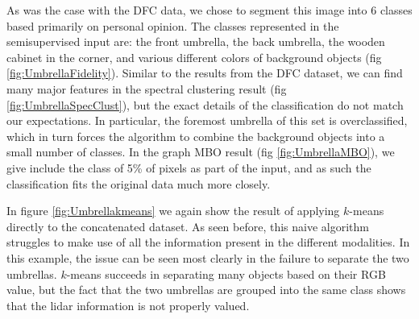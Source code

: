 \documentclass[journal]{IEEEtran}
\begin{document}
As was the case with the DFC data, we chose to segment this image into 6 classes
based primarily on personal opinion. The classes represented in the
semisupervised input are: the front umbrella, the back umbrella, the wooden
cabinet in the corner, and various different colors of background objects (fig
\ref{fig:UmbrellaFidelity}). Similar to the results from the DFC dataset, we can
find many major features in the spectral clustering result (fig
\ref{fig:UmbrellaSpecClust}), but the exact details of the classification do not
match our expectations. In particular, the foremost umbrella of this set is
overclassified, which in turn forces the algorithm to combine the background
objects into a small number of classes. In the graph MBO result (fig
\ref{fig:UmbrellaMBO}), we give include the class of 5\% of pixels as part of
the input, and as such the classification fits the original data much more
closely.

In figure \ref{fig:Umbrellakmeans} we again show the result of applying
$k$-means directly to the concatenated dataset. As seen before, this naive
algorithm struggles to make use of all the information present in the different
modalities. In this example, the issue can be seen most clearly in the failure
to separate the two umbrellas. $k$-means succeeds in separating many objects
based on their RGB value, but the fact that the two umbrellas are grouped into
the same class shows that the lidar information is not properly valued.

\end{document}
